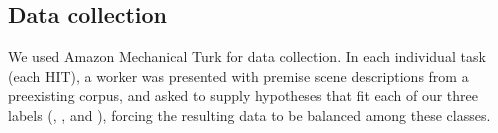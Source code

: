 





\subsection{Data collection}

We used Amazon Mechanical Turk for data collection. In each individual task (each HIT), a worker was presented with premise scene descriptions from a preexisting corpus, and asked to supply hypotheses that fit each of our three labels (, , and ), forcing the resulting data to be balanced among these classes.

